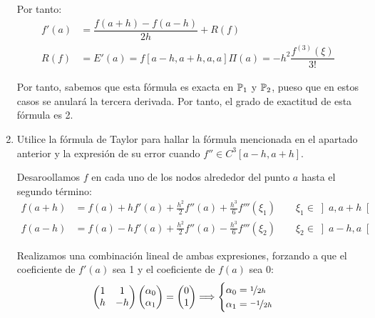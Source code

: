 \begin{ejercicio}
\begin{enumerate}
        Por tanto:
        \begin{align*}
            f'(a) &= \dfrac{f(a+h) - f(a-h)}{2h} + R(f)\\
            R(f) &= E'(a) = f[a-h, a+h, a, a]\Pi(a) =
            - h^2\dfrac{f^{(3)}(\xi)}{3!}
        \end{align*}

        Por tanto, sabemos que esta fórmula es exacta en $\mathbb{P}_1$ y $\mathbb{P}_2$, pueso que en estos casos se anulará la tercera derivada. Por tanto, el grado de exactitud de esta fórmula es 2.
        
        \item Utilice la fórmula de Taylor para hallar la fórmula mencionada en el apartado anterior y la expresión de su error cuando $f'' \in C^3[a - h, a + h]$.
        
        Desaroollamos $f$ en cada uno de los nodos alrededor del punto $a$ hasta el segundo término:
        \begin{align*}
            f(a+h) &= f(a) + hf'(a) + \frac{h^2}{2}f''(a) + \frac{h^3}{6}f'''(\xi_1)\qquad \xi_1\in\left]a, a+h\right[\\
            f(a-h) &= f(a) - hf'(a) + \frac{h^2}{2}f''(a) - \frac{h^3}{6}f'''(\xi_2)\qquad \xi_2\in\left]a-h, a\right[
        \end{align*}

        Realizamos una combinación lineal de ambas expresiones, forzando a que el coeficiente de $f'(a)$ sea 1 y el coeficiente de $f(a)$ sea 0:
        \begin{equation*}
            \begin{pmatrix}
                1 & 1\\
                h & -h
            \end{pmatrix}
            \begin{pmatrix}
                \alpha_0\\
                \alpha_1
            \end{pmatrix}
            =
            \begin{pmatrix}
                0\\
                1
            \end{pmatrix}
            \Longrightarrow
            \begin{cases}
                \alpha_0 = \nicefrac{1}{2h}\\
                \alpha_1 = \nicefrac{-1}{2h}
            \end{cases}
        \end{equation*}


\end{enumerate}
\end{ejercicio}
